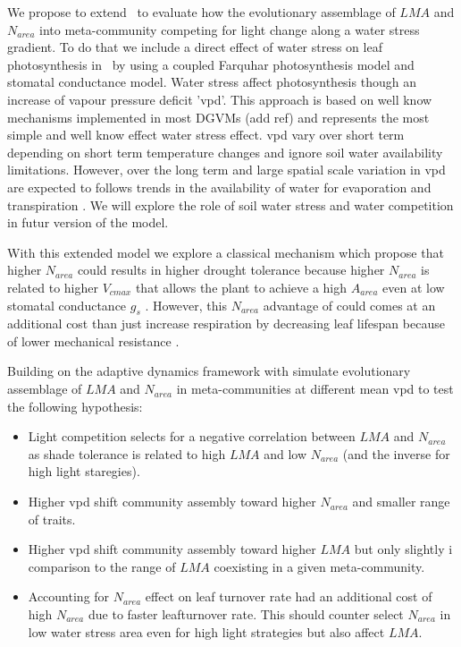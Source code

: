 \documentclass[a4paper,11pt]{article}
\begin{document}
We propose to extend \plant\ to evaluate how the evolutionary assemblage of $LMA$ and $N_{area}$ into meta-community competing for light change along a water stress gradient. To do that we include a direct effect of water stress on leaf photosynthesis in \plant\ by using a coupled Farquhar photosynthesis model and stomatal conductance model. Water stress affect photosynthesis though an increase of vapour pressure deficit 'vpd'. This approach
is based on well know mechanisms implemented in most DGVMs (add ref) and represents the most simple and well know effect water stress effect. vpd vary over short term depending on short term temperature changes and ignore soil water availability limitations. However, over the long term and large spatial scale variation in vpd are expected to follows trends in the availability of water for evaporation and transpiration \citep{Prentice-2014}. We will explore the role of soil water stress and water competition in futur version of the model.


With this extended model we explore a classical mechanism which propose that higher $N_{area}$ could results in higher drought tolerance because higher $N_{area}$ is related to higher $V_{cmax}$ that allows the
plant to achieve a high $A_{area}$ even at low stomatal conductance
$g_s$ \citep{Wright-2003}. However, this $N_{area}$ advantage of could comes at an additional cost than just increase respiration by decreasing leaf lifespan because of lower mechanical resistance \citep{Wright-2002a}.

Building on the adaptive dynamics framework with simulate evolutionary assemblage of $LMA$ and $N_{area}$ in meta-communities at different mean vpd to test the following hypothesis:  
 
\begin{itemize}

\item Light competition selects for a negative correlation between $LMA$ and $N_{area}$ as shade tolerance is related to high $LMA$ and low $N_{area}$ (and the inverse for high light staregies).

\item Higher vpd shift community assembly toward higher $N_{area}$ and smaller range of traits.

\item Higher vpd shift community assembly toward higher $LMA$ but only slightly i comparison to the range of $LMA$ coexisting in a given meta-community.

\item Accounting for $N_{area}$ effect on leaf turnover rate had an additional cost of high $N_{area}$ due to faster leafturnover rate. This should counter select $N_{area}$ in low water stress area even for high light strategies but also affect $LMA$.

\end{itemize}
\end{document}
